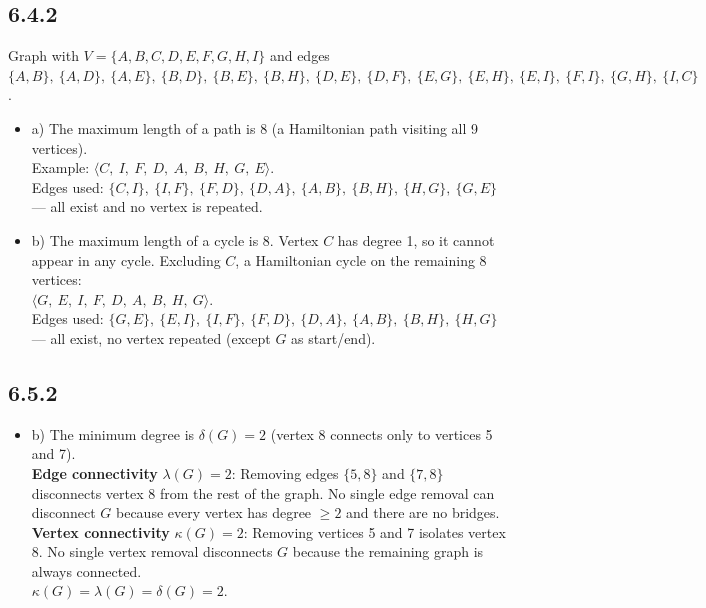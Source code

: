 \documentclass{article}
\begin{document}
\subsection*{6.4.2}
Graph with $V = \{A,B,C,D,E,F,G,H,I\}$ and edges $\{A,B\},\ \{A,D\},\ \{A,E\},\ \{B,D\},\ \{B,E\},\ \{B,H\},\ \{D,E\},\ \{D,F\},\ \{E,G\},\ \{E,H\},\ \{E,I\},\ \{F,I\},\ \{G,H\},\ \{I,C\}$.
\begin{itemize}
    \item a) The maximum length of a path is 8 (a Hamiltonian path visiting all 9 vertices).\\
    Example: $\langle C,\ I,\ F,\ D,\ A,\ B,\ H,\ G,\ E \rangle$.\\
    Edges used: $\{C,I\},\ \{I,F\},\ \{F,D\},\ \{D,A\},\ \{A,B\},\ \{B,H\},\ \{H,G\},\ \{G,E\}$ --- all exist and no vertex is repeated.

    \item b) The maximum length of a cycle is 8. Vertex $C$ has degree 1, so it cannot appear in any cycle. Excluding $C$, a Hamiltonian cycle on the remaining 8 vertices:\\
    $\langle G,\ E,\ I,\ F,\ D,\ A,\ B,\ H,\ G \rangle$.\\
    Edges used: $\{G,E\},\ \{E,I\},\ \{I,F\},\ \{F,D\},\ \{D,A\},\ \{A,B\},\ \{B,H\},\ \{H,G\}$ --- all exist, no vertex repeated (except $G$ as start/end).
\end{itemize}

\subsection*{6.5.2}
\begin{itemize}
    \item b) The minimum degree is $\delta(G) = 2$ (vertex 8 connects only to vertices 5 and 7).\\[4pt]
    \textbf{Edge connectivity} $\lambda(G) = 2$: Removing edges $\{5,8\}$ and $\{7,8\}$ disconnects vertex 8 from the rest of the graph. No single edge removal can disconnect $G$ because every vertex has degree $\ge 2$ and there are no bridges.\\[4pt]
    \textbf{Vertex connectivity} $\kappa(G) = 2$: Removing vertices 5 and 7 isolates vertex 8. No single vertex removal disconnects $G$ because the remaining graph is always connected.\\[4pt]
    $\kappa(G) = \lambda(G) = \delta(G) = 2$.
\end{itemize}
\end{document}
